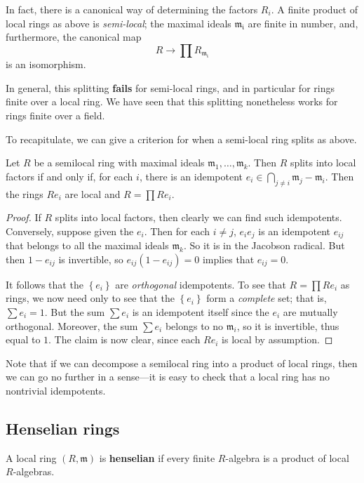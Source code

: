 In fact, there is a canonical way of determining the factors $R_i$. 
A finite product of local rings as above is \textit{semi-local}; 
the maximal ideals $\mathfrak{m_i}$ are finite in number, and, furthermore, the
canonical map
\[ R \to \prod R_{\mathfrak{m_i}} \]
is an isomorphism.


In general, this splitting \textbf{fails} for semi-local rings, and in
particular for rings finite over a local ring.
We have seen that this splitting nonetheless works for rings finite
over a field.


To recapitulate, we can give a criterion for when a semi-local ring splits as
above.
\begin{proposition} \label{whatissplitting}
Let $R$ be a semilocal ring with maximal ideals $\mathfrak{m}_1, \dots,
\mathfrak{m}_k$. Then $R$ splits into local factors if and only if, for each
$i$, there is an idempotent $e_i \in \bigcap_{j \neq i} \mathfrak{m}_j -
\mathfrak{m}_i$. Then the rings $Re_i$ are local and $R = \prod Re_i$.
\end{proposition} 
\begin{proof} 
If $R$ splits into local factors, then clearly we can find such idempotents.
Conversely, suppose given the $e_i$.
Then for each $i \neq j$, $e_i e_j$ is an idempotent  $e_{ij}$ that belongs to all the
maximal ideals $\mathfrak{m}_k$. So it is in the Jacobson radical. But then $1 -
e_{ij}$ is invertible, so $e_{ij}(1-e_{ij})=0$ implies that $e_{ij} = 0$. 

It follows that the $\left\{e_i\right\}$ are \emph{orthogonal} idempotents. To
see that $R = \prod Re_i$ as rings, we now need only to see that the
$\left\{e_i\right\}$ form a \emph{complete} set; that is, $\sum e_i = 1$. But
the sum $\sum e_i$ is an idempotent itself since the $e_i$ are mutually
orthogonal. Moreover, the sum $\sum e_i$ belongs to no $\mathfrak{m}_i$, so it
is invertible, thus equal to $1$. The claim is now clear, since each $Re_i$ is
local by assumption.
\end{proof} 

Note that if we can decompose a semilocal ring into a product of local rings,
then we can go no further in a sense---it is easy to check that a local ring has
no nontrivial idempotents. 

\subsection{Henselian rings}

\begin{definition}
A local ring $(R, \mathfrak{m})$ is \textbf{henselian} if every finite
$R$-algebra is a product of local $R$-algebras.
\end{definition}


